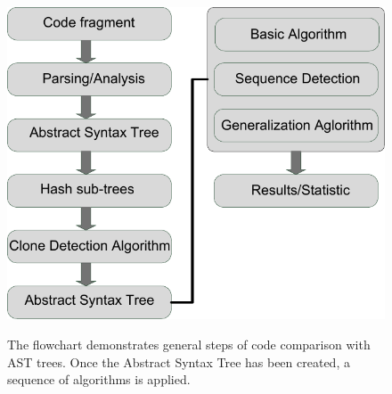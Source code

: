 \documentclass{report}
\begin{document}
\begin{figure}[h]
  \centering
  \includegraphics[scale=0.75]{Figures/exist-alg/ast-scheme2.pdf}\\[0.1cm]
  \caption[General steps of algorithm to compare code with AST tree]{The flowchart demonstrates general steps of code comparison with AST trees. Once the Abstract Syntax Tree has been created, a sequence of algorithms is applied.}
\end{figure}
\end{document}
